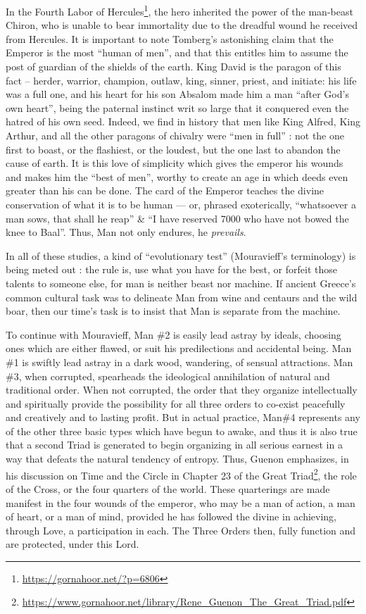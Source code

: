 In the Fourth Labor of Hercules\footnote{\url{https://gornahoor.net/?p=6806}}, the hero inherited the power of the man-beast Chiron, who is unable to bear immortality due to the dreadful wound he received from Hercules. It is important to note Tomberg's astonishing claim that the Emperor is the most ``human of men'', and that this entitles him to assume the post of guardian of the shields of the earth. King David is the paragon of this fact -- herder, warrior, champion, outlaw, king, sinner, priest, and initiate: his life was a full one, and his heart for his son Absalom made him a man ``after God's own heart'', being the paternal instinct writ so large that it conquered even the hatred of his own seed. Indeed, we find in history that men like King Alfred, King Arthur, and all the other paragons of chivalry were ``men in full'' : not the one first to boast, or the flashiest, or the loudest, but the one last to abandon the cause of earth. It is this love of simplicity which gives the emperor his wounds and makes him the ``best of men'', worthy to create an age in which deeds even greater than his can be done. The card of the Emperor teaches the divine conservation of what it is to be human --- or, phrased exoterically, ``whatsoever a man sows, that shall he reap'' \& ``I have reserved 7000 who have not bowed the knee to Baal''. Thus, Man not only endures, he \emph{prevails}.

In all of these studies, a kind of ``evolutionary test'' (Mouravieff's terminology) is being meted out : the rule is, use what you have for the best, or forfeit those talents to someone else, for man is neither beast nor machine. If ancient Greece's common cultural task was to delineate Man from wine and centaurs and the wild boar, then our time's task is to insist that Man is separate from the machine.

To continue with Mouravieff, Man \#2 is easily lead astray by ideals, choosing ones which are either flawed, or suit his predilections and accidental being. Man \#1 is swiftly lead astray in a dark wood, wandering, of sensual attractions. Man \#3, when corrupted, spearheads the ideological annihilation of natural and traditional order. When not corrupted, the order that they organize intellectually and spiritually provide the possibility for all three orders to co-exist peacefully and creatively and to lasting profit. But in actual practice, Man\#4 represents any of the other three basic types which have begun to awake, and thus it is also true that a second Triad is generated to begin organizing in all serious earnest in a way that defeats the natural tendency of entropy. Thus, Guenon emphasizes, in his discussion on Time and the Circle in Chapter 23 of the Great Triad\footnote{\url{https://www.gornahoor.net/library/Rene\_Guenon\_The\_Great\_Triad.pdf}}, the role of the Cross, or the four quarters of the world. These quarterings are made manifest in the four wounds of the emperor, who may be a man of action, a man of heart, or a man of mind, provided he has followed the divine in achieving, through Love, a participation in each. The Three Orders then, fully function and are protected, under this Lord.

